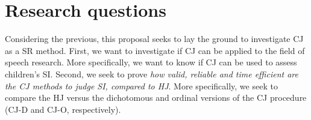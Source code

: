 \section{Research questions} \label{seq:rq}

Considering the previous, this proposal seeks to lay the ground to investigate CJ as a SR method. First, we want to investigate if CJ can be applied to the field of speech research. More specifically, we want to know if CJ can be used to assess children’s SI. Second, we seek to prove \textit{how valid, reliable and time efficient are the CJ methods to judge SI, compared to HJ}. More specifically, we seek to compare the HJ versus the dichotomous and ordinal versions of the CJ procedure (CJ-D and CJ-O, respectively).